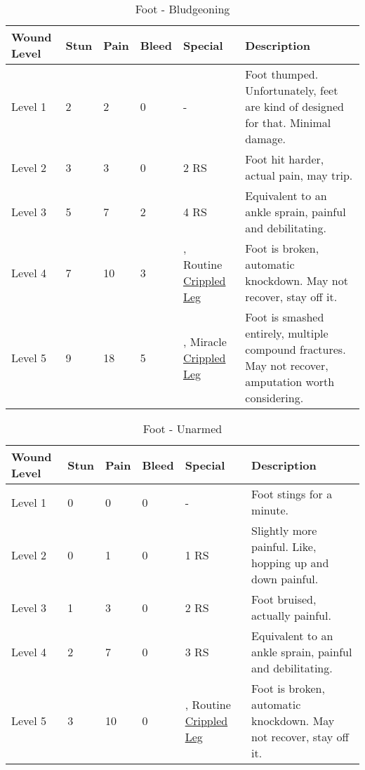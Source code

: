 \documentclass[oneside,11pt,english]{book}
\begin{document}
\begin{table}[hb] %
	\caption{Foot - Bludgeoning}
	\label{wound:Foot - Bludgeoning}
	\begin{tabu} to 
Wound Level &Stun &Pain &Bleed &Special &Description\\\toprule
Level 1& 2& 2& 0& - &Foot thumped. Unfortunately, feet are kind of designed for that. Minimal damage.\\
Level 2& 3& 3& 0&  2 RS &Foot hit harder, actual pain, may trip.\\
Level 3& 5& 7& 2&  4 RS &Equivalent to an ankle sprain, painful and debilitating.\\
Level 4& 7& 10& 3& , \newline
	Routine~ \hyperref[bane:Crippled Limb/Appendage]{Crippled Leg} &Foot is broken, automatic knockdown. May not recover, stay off it.\\
Level 5& 9& 18& 5& , \newline
	Miracle~ \hyperref[bane:Crippled Limb/Appendage]{Crippled Leg} &Foot is smashed entirely, multiple compound fractures. May not recover, amputation worth considering.\\
	\end{tabu}
\end{table}

\begin{table}[!hb] %
	\caption{Foot - Unarmed}
	\label{wound:Foot - Unarmed}
	\begin{tabu} to 
Wound Level &Stun &Pain &Bleed &Special &Description\\\toprule
Level 1& 0& 0& 0& - &Foot stings for a minute.\\
Level 2& 0& 1& 0&  1 RS &Slightly more painful. Like, hopping up and down painful.\\
Level 3& 1& 3& 0&  2 RS &Foot bruised, actually painful.\\
Level 4& 2& 7& 0&  3 RS &Equivalent to an ankle sprain, painful and debilitating.\\
Level 5& 3& 10& 0& , \newline
	Routine~ \hyperref[bane:Crippled Limb/Appendage]{Crippled Leg} &Foot is broken, automatic knockdown. May not recover, stay off it.\\
	\end{tabu}
\end{table}
	\clearpage
\end{document}

